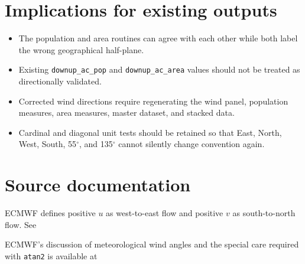 \documentclass[10pt]{article}
\begin{document}
\section*{Implications for existing outputs}
\begin{itemize}
  \item The population and area routines can agree with each other while both
        label the wrong geographical half-plane.
  \item Existing \texttt{downup\_ac\_pop} and \texttt{downup\_ac\_area}
        values should not be treated as directionally validated.
  \item Corrected wind directions require regenerating the wind panel,
        population measures, area measures, master dataset, and stacked data.
  \item Cardinal and diagonal unit tests should be retained so that East,
        North, West, South, 55$^\circ$, and 135$^\circ$ cannot silently change
        convention again.
\end{itemize}

\section*{Source documentation}
ECMWF defines positive $u$ as west-to-east flow and positive $v$ as
south-to-north flow. See
\begin{flushleft}\small\ttfamily
{}
\end{flushleft}
ECMWF's discussion of meteorological wind angles and the special care required
with \texttt{atan2} is available at
\begin{flushleft}\small\ttfamily
{}
\end{flushleft}
\end{document}
